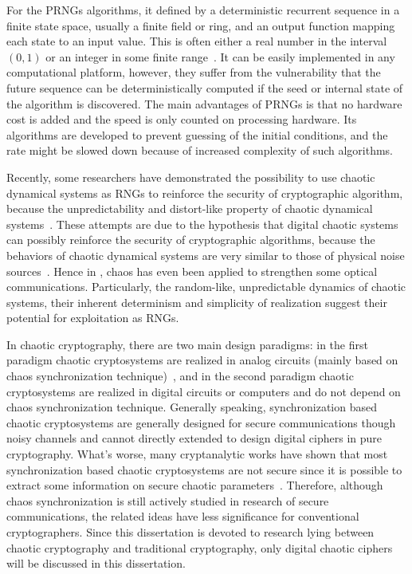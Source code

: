 For the PRNGs algorithms, it defined by a deterministic recurrent sequence in a finite state space, 
usually a finite field or ring, and an output function mapping each state to an input value. 
This is often either a real number in the interval $(0,1)$ or an integer in some finite range~\cite{LEcuyer08}.
It can be easily implemented
in any computational platform, however, they suffer from the
vulnerability that the future sequence can be deterministically
computed if the seed or internal state of the algorithm is discovered.
The main advantages of PRNGs is that no hardware cost is added and the
speed is only counted on processing hardware. Its algorithms are
developed to prevent guessing of the initial conditions, and the rate
might be slowed down because of increased complexity of such
algorithms.

Recently, some researchers have demonstrated 
the possibility to use chaotic dynamical systems as 
RNGs to reinforce the security of cryptographic algorithm, 
because the unpredictability and distort-like property of chaotic dynamical 
systems~\cite{Falcioni2005,Cecen2009,PO2004}. 
These attempts are due to the hypothesis that digital chaotic systems can possibly reinforce the security 
of cryptographic algorithms, because the behaviors of chaotic dynamical systems are very similar to those of 
physical noise sources~\cite{Schuster1984}. Hence in \cite{cite-key}, chaos has even 
been applied to strengthen some optical communications. Particularly,  
the random-like, unpredictable dynamics of chaotic systems, 
their inherent determinism and simplicity of realization suggest their potential for exploitation as RNGs.

In chaotic cryptography, there are two main design paradigms: in the first
paradigm chaotic cryptosystems are realized in analog circuits (mainly based on
chaos synchronization technique)~\cite{PhysRevLett.64.821}, and in the second paradigm chaotic cryptosystems
are realized in digital circuits or computers and do not depend on
chaos synchronization technique. Generally speaking, synchronization based
chaotic cryptosystems are generally designed for secure communications though
noisy channels and cannot directly extended to design digital ciphers in pure
cryptography. What's worse, many cryptanalytic works have shown that most
synchronization based chaotic cryptosystems are not secure since it is possible
to extract some information on secure chaotic parameters~\cite{BethLaMa94}. Therefore,
although chaos synchronization is still actively studied in research of secure
communications, the related ideas have less significance for conventional cryptographers.
Since this dissertation is devoted to research lying between chaotic
cryptography and traditional cryptography, only digital chaotic ciphers will be
discussed in this dissertation.

